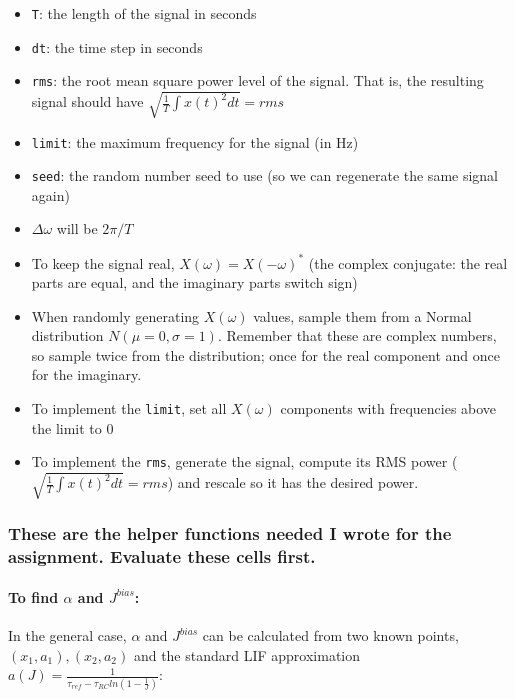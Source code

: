 \documentclass{article}
\begin{document}
\begin{itemize}
\item
  \texttt{T}: the length of the signal in seconds
\item
  \texttt{dt}: the time step in seconds
\item
  \texttt{rms}: the root mean square power level of the signal. That is,
  the resulting signal should have
  $\sqrt{\frac{1}{T} \int{x(t)^2}dt}=rms$
\item
  \texttt{limit}: the maximum frequency for the signal (in Hz)
\item
  \texttt{seed}: the random number seed to use (so we can regenerate the
  same signal again)
\item
  $\Delta \omega$ will be $2 \pi / T$
\item
  To keep the signal real, $X(\omega)=X(-\omega)^*$ (the complex
  conjugate: the real parts are equal, and the imaginary parts switch
  sign)
\item
  When randomly generating $X(\omega)$ values, sample them from a Normal
  distribution $N(\mu=0,\sigma=1)$. Remember that these are complex
  numbers, so sample twice from the distribution; once for the real
  component and once for the imaginary.
\item
  To implement the \texttt{limit}, set all $X(\omega)$ components with
  frequencies above the limit to 0
\item
  To implement the \texttt{rms}, generate the signal, compute its RMS
  power ($\sqrt{\frac{1}{T} \int{x(t)^2}dt}=rms$) and rescale so it has
  the desired power.
\end{itemize}

    \subsubsection{These are the helper functions needed I wrote for the
assignment. Evaluate these cells
first.}\label{these-are-the-helper-functions-needed-i-wrote-for-the-assignment.-evaluate-these-cells-first.}

\paragraph{To find $\alpha$ and
$J^{bias}$:}\label{to-find-alpha-and-jbias}

In the general case, $\alpha$ and $J^{bias}$ can be calculated from two
known points, $(x_1, a_1), (x_2, a_2)$ and the standard LIF
approximation $a(J)=\frac{1} {\tau_{ref}-\tau_{RC}ln(1-\frac{1}{J})}$:
\end{document}
